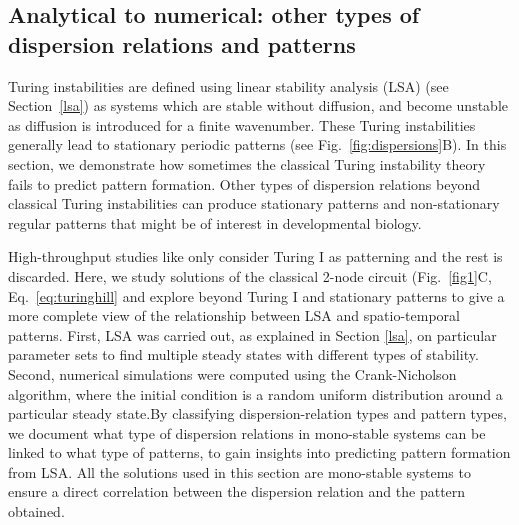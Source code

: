 \subsection{Analytical to numerical: other types of dispersion relations and patterns} \label{nogrowth}

Turing instabilities are defined using linear stability analysis (LSA) (see Section~\ref{lsa}) as systems which are stable without diffusion, and become unstable as diffusion is introduced for a finite wavenumber. These Turing instabilities generally lead to stationary periodic patterns (see Fig.~\ref{fig:dispersions}B). In this section, we demonstrate how sometimes the classical Turing instability theory fails to predict pattern formation.
Other types of dispersion relations beyond classical Turing instabilities can produce stationary patterns and non-stationary regular patterns that might be of interest in developmental biology.

High-throughput studies like \cite{Scholes2019, Zheng2016, Marcon} only consider Turing I as patterning and the rest is discarded.
Here, we study solutions of the classical 2-node circuit (Fig.~\ref{fig1}C, Eq.~\ref{eq:turinghill} and explore beyond Turing I and stationary patterns to give a more complete view of the relationship between LSA and spatio-temporal patterns. 
First, LSA was carried out, as explained in Section \ref{lsa}, on particular parameter sets to find multiple steady states with different types of stability. 
Second, numerical simulations were computed using the Crank-Nicholson algorithm, where the initial condition is a random uniform distribution around a particular steady state.By classifying dispersion-relation types and pattern types, we document what type of dispersion relations in mono-stable systems can be linked to what type of patterns, to gain insights into predicting pattern formation from LSA. All the solutions used in this section are mono-stable systems to ensure a direct correlation between the dispersion relation and the pattern obtained.

